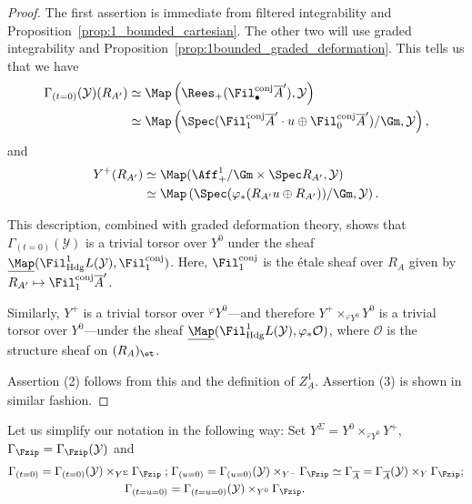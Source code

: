 \documentclass[10pt]{amsart}
\begin{document}
\begin{proof}
The first assertion is immediate from filtered integrability and Proposition~\ref{prop:1_bounded_cartesian}. The other two will use graded integrability and Proposition~\ref{prop:1bounded_graded_deformation}. This tells us that we have
\begin{align*}
\Gamma_{(t=0)}(\mathcal{Y})(R_{A'}) &\simeq \Map\left(\Rees_+(\Fil^{\mathrm{conj}}_\bullet \overline{A}'),\mathcal{Y}\right)\\
&\simeq \Map\left(\Spec(\Fil^{\mathrm{conj}}_1\overline{A}'\cdot u \oplus \Fil^{\mathrm{conj}}_0\overline{A}')/\Gm,\mathcal{Y}\right),
\end{align*}
and
\begin{align*}
Y^+(R_{A'})&\simeq \Map(\Aff^1_+/\Gm\times\Spec R_{A'},\mathcal{Y})\\
&\simeq\Map\left(\Spec(\varphi_*(R_{A'}u\oplus R_{A'}))/\Gm,\mathcal{Y}\right).
\end{align*}

This description, combined with graded deformation theory, shows that $\Gamma_{(t=0)}(\mathcal{Y})$ is a trivial torsor over $Y^0$ under the sheaf $\underline{\Map}(\Fil^1_{\mathrm{Hdg}}L(\mathcal{Y}),\Fil^{\mathrm{conj}}_1)$. Here, $\Fil^{\mathrm{conj}}_1$ is the \'etale sheaf over $R_A$ given by $R_{A'}\mapsto \Fil^{\mathrm{conj}}_1\overline{A}'$.

Similarly, $Y^+$ is a trivial torsor over ${}^\varphi Y^0$---and therefore $Y^+\times_{{}^\varphi Y^0}Y^0$ is a trivial torsor over $Y^0$---under the sheaf $\underline{\Map}(\Fil^1_{\mathrm{Hdg}}L(\mathcal{Y}),\varphi_* \mathcal{O})$, where $\mathcal{O}$ is the structure sheaf on $(R_A)_{\et}$.

Assertion (2) follows from this and the definition of $Z^1_{\underline{A}}$. Assertion (3) is shown in similar fashion.
\end{proof}

\begin{notation}
Let us simplify our notation in the following way: Set $Y^{\Sigma} = Y^0\times_{{}^\varphi Y^0}Y^+$, $\Gamma_{\Fzip} = \Gamma_{\Fzip}(\mathcal{Y})$ and
\begin{align*}
\Gamma_{(t=0)} = \Gamma_{(t=0)}(\mathcal{Y})\times_{Y^\Sigma}\Gamma_{\Fzip}\;;&\; \Gamma_{(u=0)} = \Gamma_{(u=0)}(\mathcal{Y})\times_{Y^-}\Gamma_{\Fzip}\simeq \Gamma_{\overline{A}} = \Gamma_{\overline{A}}(\mathcal{Y})\times_Y\Gamma_{\Fzip};\\
\Gamma_{(t=u=0)} &= \Gamma_{(t=u=0)}(\mathcal{Y})\times_{Y^0}\Gamma_{\Fzip}.
\end{align*}
\end{notation}
\end{document}
